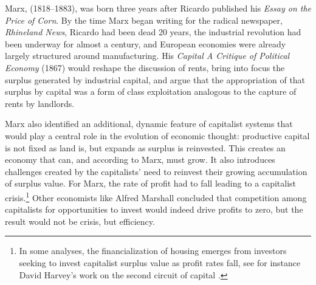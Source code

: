 Marx, (1818--1883), was born three years after Ricardo published his \textit{Essay on the Price of Corn}. By the time Marx began writing for the radical newspaper, \textit{Rhineland News}, Ricardo had been dead 20 years, the industrial revolution had been underway for almost a century, and European economies were already largely structured around manufacturing. His \emph{Capital A Critique of Political Economy} %
(1867) would reshape the discussion of rents, bring into focus the surplus generated by industrial capital, and argue that the appropriation of that surplus by capital was a form of class exploitation analogous to the capture of rents by landlords.

Marx also identified an additional, dynamic feature of capitalist systems that would play a central role in the evolution of economic thought: productive capital is not fixed as land is, but expands as surplus is reinvested. This creates an economy that can, and according to Marx, must grow. It also introduces challenges created by the capitalists' need to reinvest their growing accumulation of surplus value.  For Marx, the rate of profit had to fall leading to a capitalist crisis.\footnote{In some analyses, the financialization of housing emerges from investors seeking to invest capitalist surplus value as profit rates fall, see for instance David Harvey's work on \gls{the second circuit of capital} \cite{GET_david_harvey}.} Other economists like Alfred Marshall concluded that competition among capitalists for opportunities to invest would indeed drive profits to zero, but the result would not be crisis, but efficiency.

